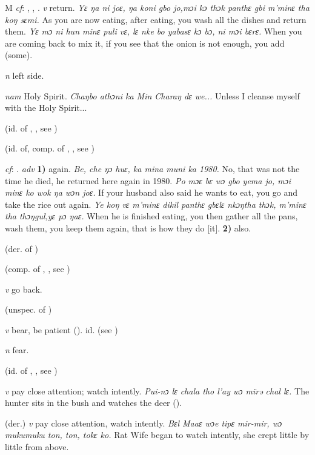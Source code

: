 \begin{letter}{M}
 \textit{cf}: , , . \textit{v} return. \textit{Yɛ ŋa ni joɛ, ŋa koni gbo jo,mɔi kɔ thɔk panthɛ gbi m'minɛ tha koŋ sɛmi.} As you are now eating, after eating, you wash all the dishes and return them. \textit{Yɛ mɔ ni hun minɛ puli vɛ, lɛ nke bo yabasɛ kɔ bɔ, ni mɔi bɛrɛ.} When you are coming back to mix it, if you see that the onion is not enough, you add (some).

 \textit{n} left side.

 \textit{nam} Holy Spirit. \textit{Chaŋbo athɔni ka Min Charaŋ dɛ we...} Unless I cleanse myself with the Holy Spirit...

 (id. of , , see ) 

 (id. of, comp. of , , see ) 

 \textit{cf}: . \textit{adv} \textbf{1)} again. \textit{Be, che ŋɔ huɛ, ka mina muni ka 1980.} No, that was not the time he died, he returned here again in 1980. \textit{Po mɔɛ bɛ wɔ gbo yema jo, mɔi minɛ ko wok ŋa wɔn joɛ.} If your husband also said he wants to eat, you go and take the rice out again. \textit{Ye koŋ vɛ m'minɛ dikil panthɛ gbɛlɛ nkɔŋtha thɔk, m'minɛ tha thɔŋgul,yɛ pɔ ŋaɛ.} When he is finished eating, you then gather all the pans, wash them, you keep them again, that is how they do [it]. \textbf{2)} also.

 (der. of ) 

 (comp. of , , see ) 

 \textit{v} go back.

 (unspec. of ) 

 \textit{v} bear, be patient (\citealt{Pichl1967}). id.  (see ) 

 \textit{n} fear.

 (id. of , , see ) 

 \textit{v} pay close attention; watch intently. \textit{Pui-nɔ lɛ chala tho l'ay wɔ mïrə chal lɛ.} The hunter sits in the bush and watches the deer (\citealt{Pichl1967}).

 (der.) \textit{v} pay close attention, watch intently. \textit{Bɛl Maaɛ wɔe tipɛ mir-mir, wɔ mukumuku ton, ton, tokɛ ko.} Rat Wife began to watch intently, she crept little by little from above.


\end{letter}
